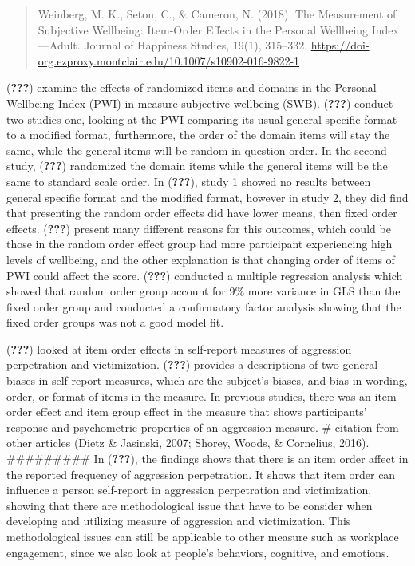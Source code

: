 \documentclass[
  english,
  man]{apa6}
\begin{document}
\begin{quote}
Weinberg, M. K., Seton, C., \& Cameron, N. (2018). The Measurement of Subjective Wellbeing: Item-Order Effects in the Personal Wellbeing Index---Adult. Journal of Happiness Studies, 19(1), 315--332. \url{https://doi-org.ezproxy.montclair.edu/10.1007/s10902-016-9822-1}
\end{quote}

({\textbf{???}}) examine the effects of randomized items and domains in the Personal Wellbeing Index (PWI) in measure subjective wellbeing (SWB). ({\textbf{???}}) conduct two studies one, looking at the PWI comparing its usual general-specific format to a modified format, furthermore, the order of the domain items will stay the same, while the general items will be random in question order. In the second study, ({\textbf{???}}) randomized the domain items while the general items will be the same to standard scale order. In ({\textbf{???}}), study 1 showed no results between general specific format and the modified format, however in study 2, they did find that presenting the random order effects did have lower means, then fixed order effects. ({\textbf{???}}) present many different reasons for this outcomes, which could be those in the random order effect group had more participant experiencing high levels of wellbeing, and the other explanation is that changing order of items of PWI could affect the score. ({\textbf{???}}) conducted a multiple regression analysis which showed that random order group account for 9\% more variance in GLS than the fixed order group and conducted a confirmatory factor analysis showing that the fixed order groups was not a good model fit.

({\textbf{???}}) looked at item order effects in self-report measures of aggression perpetration and victimization. ({\textbf{???}}) provides a descriptions of two general biases in self-report measures, which are the subject's biases, and bias in wording, order, or format of items in the measure. In previous studies, there was an item order effect and item group effect in the measure that shows participants' response and psychometric properties of an aggression measure. \# citation from other articles (Dietz \& Jasinski, 2007; Shorey, Woods, \& Cornelius, 2016). \#\#\#\#\#\#\#\#\# In ({\textbf{???}}), the findings shows that there is an item order affect in the reported frequency of aggression perpetration. It shows that item order can influence a person self-report in aggression perpetration and victimization, showing that there are methodological issue that have to be consider when developing and utilizing measure of aggression and victimization. This methodological issues can still be applicable to other measure such as workplace engagement, since we also look at people's behaviors, cognitive, and emotions.
\end{document}
